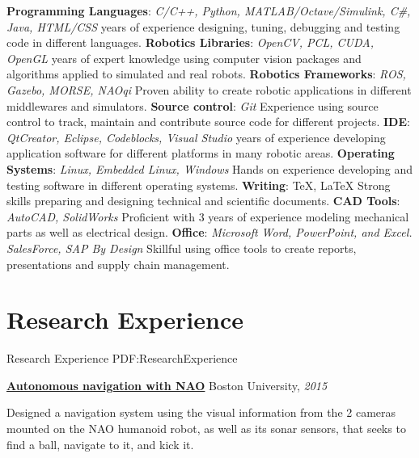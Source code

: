 \documentclass[letterpaper,MMMyyyy,nonstop]{simpleresumecv}
\begin{document}
\begin{body}
\GapNoBreak
\BulletItem
\textbf{Programming Languages}: \textit{C/C++, Python, MATLAB/Octave/Simulink, C\#, Java, HTML/CSS}
 years of experience designing, tuning, debugging and testing code in different languages.
\BulletItem
\textbf{Robotics Libraries}: \textit{OpenCV, PCL, CUDA, OpenGL}
 years of expert knowledge using computer vision packages and algorithms applied to simulated and real robots.
\BulletItem
\textbf{Robotics Frameworks}: \textit{ROS, Gazebo, MORSE, NAOqi}
\SubBulletItem
Proven ability to create robotic applications in different middlewares and simulators.
\BulletItem
\textbf{Source control}: \textit{Git}
\SubBulletItem
Experience using source control to track, maintain and contribute source code for different projects.
\BulletItem
\textbf{IDE}: \textit{QtCreator, Eclipse, Codeblocks, Visual Studio}
 years of experience developing application software for different platforms in many robotic areas.
\BulletItem
\textbf{Operating Systems}: \textit{Linux, Embedded Linux, Windows}
\SubBulletItem
Hands on experience developing and testing software in different operating systems.
\BulletItem
\textbf{Writing}: {\TeX}, {\LaTeX}
\SubBulletItem
Strong skills preparing and designing technical and scientific documents.
\BulletItem
\textbf{CAD Tools}: \textit{AutoCAD, SolidWorks}
\SubBulletItem
Proficient with 3 years of experience modeling mechanical parts as well as electrical design.
\BulletItem
\textbf{Office}: \textit{Microsoft Word, PowerPoint, and Excel. SalesForce, SAP By Design}
\SubBulletItem
Skillful using office tools to create reports, presentations and supply chain management.


\section
{Research Experience}
{Research Experience}
{PDF:ResearchExperience}

\href{http://www.bu.edu/vip/files/pubs/reports/DLTM15-06buece.pdf}
{\textbf{Autonomous navigation with NAO}}
\hfill
Boston University, \textit{2015}

\GapNoBreak
\BulletItem
Designed a navigation system using the visual information from the 2 cameras mounted on the NAO humanoid robot, as well as its sonar sensors, that seeks to find a ball, navigate to it, and kick it.
\GapNoBreak


\end{body}
\end{document}
